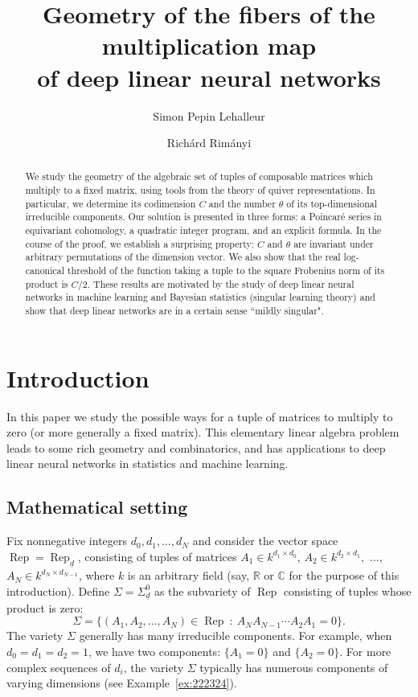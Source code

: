 \documentclass[a4paper]{amsart}
\title[Geometry of linear neural networks]{Geometry of the fibers of the multiplication map \\ of deep linear neural networks}
\author{Simon Pepin Lehalleur}
\author{Rich\'{a}rd Rim\'{a}nyi}
\DeclareMathOperator{\Rep}{\mathrm{Rep}}
\newcommand{\R}{\mathbb{R}}
\newcommand{\C}{\mathbb{C}}
\newcommand{\ud}{\underline{d}}
\newcommand{\codimnot}{C}
\theoremstyle{plain}
\begin{document}
\begin{abstract}
We study the geometry of the algebraic set of tuples of composable matrices which multiply to a fixed matrix, using %
tools from the theory of quiver representations. In particular, we determine its codimension $\codimnot$ and the number $\theta$ of its top-dimensional irreducible components. Our solution is presented in three forms: a Poincar\'e series in equivariant cohomology, a quadratic integer program, and an explicit formula. In the course of the proof, we establish a surprising property: $\codimnot$ and $\theta$ are invariant under arbitrary permutations of the dimension vector. We also show that the real log-canonical threshold of the function taking a tuple to the square Frobenius norm of its product is $\codimnot/2$. These results are motivated by the study of deep linear neural networks in machine learning and Bayesian statistics (singular learning theory) and show that deep linear networks are in a certain sense ``mildly singular".
\end{abstract}



\maketitle


\section{Introduction}

In this paper we study the possible ways for a tuple of matrices to multiply to zero (or more generally a fixed matrix). This elementary linear algebra problem leads to some rich geometry and combinatorics, and has applications to deep linear neural networks in statistics and machine learning.

\smallskip

\subsection{Mathematical setting}

Fix nonnegative integers $d_0,d_1,\ldots, d_N$ and consider the vector space $\Rep=\Rep_{\ud}$, consisting of tuples of matrices $A_1\in k^{d_1\times d_0}$, $A_2\in k^{d_2\times d_1},$ $\ldots,$ $A_N\in k^{d_N\times d_{N-1}}$, where $k$ is an arbitrary field (say, $\R$ or $\C$ for the purpose of this introduction). Define $\Sigma=\Sigma^0_{\ud}$ as the subvariety of $\Rep$ consisting of tuples whose product is zero:
\[
\Sigma=
\{ (A_1,A_2,\ldots,A_N)\in \Rep \ :\ A_N A_{N-1} \cdots A_2 A_1=0\}.
\]
The variety $\Sigma$ generally has many irreducible components. For example, when $d_0=d_1=d_2=1$, we have two components: $\{A_1=0\}$ and $\{A_2=0\}$. For more complex sequences of $d_i$, the variety $\Sigma$ typically has numerous components of varying dimensions (see Example~\ref{ex:222324}).
\end{document}
